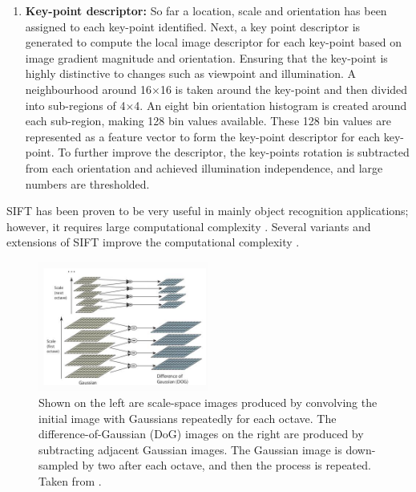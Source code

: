 \begin{enumerate}
\item\textbf{Key-point descriptor:} So far a location, scale and orientation has been assigned to each key-point identified. Next, a key point descriptor is generated to compute the local image descriptor for each key-point based on image gradient magnitude and orientation. Ensuring that the key-point is highly distinctive to changes such as viewpoint and illumination. A neighbourhood around 16$\times$16 is taken around the key-point and then divided into sub-regions of 4$\times$4. An eight bin orientation histogram is created around each sub-region, making 128 bin values available. These 128 bin values are represented as a feature vector to form the key-point descriptor for each key-point. To further improve the descriptor, the key-points rotation is subtracted from each orientation and achieved illumination independence, and large numbers are thresholded.
\end{enumerate}


SIFT has been proven to be very useful in mainly object recognition applications; however, it requires large computational complexity \cite{Lowe2004, karami2017image}. Several variants and extensions of SIFT improve the computational complexity \cite{Guzel2015, 6507640, 1315206}.

\begin{figure}[H]
    \centering
    \includegraphics[width=0.5\textwidth]{UCT_MSc_Thesis/figs/sift_steps.png}
    \caption[SIFT Difference of Gaussian]{Shown on the left are scale-space images produced by convolving the initial image with Gaussians repeatedly for each octave. The difference-of-Gaussian (DoG) images on the right are produced by subtracting adjacent Gaussian images. The Gaussian image is down-sampled by two after each octave, and then the process is repeated. Taken from \cite{Lowe2004}.}
    \label{fig:sift_steps}
\end{figure}

